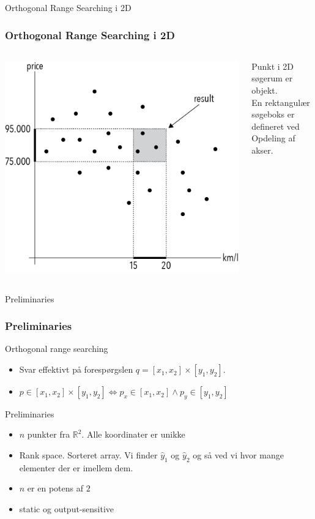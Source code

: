 \documentclass[pdf]{beamer}
\begin{document}
\begin{frame}{Orthogonal Range Searching i 2D}
  \frametitle{Orthogonal Range Searching i 2D}
  \begin{columns}
    \begin{center}
      \includegraphics[scale=0.8]{pictures/introduction.png}
    \end{center}
    Punkt i 2D søgerum er objekt.\\
    
    En rektangulær søgeboks er defineret ved \\

    Opdeling af akser.


  \end{columns}

\end{frame}

\begin{frame}{Preliminaries}
  \frametitle{Preliminaries}
  Orthogonal range searching
  \begin{itemize}
    \item Svar effektivt på forespørgslen $q = [x_1, x_2] \times [y_1, y_2]$.
    \item $p \in [x_1, x_2] \times [y_1, y_2] \Leftrightarrow p_x \in [x_1, x_2] \wedge p_y \in [y_1, y_2]$
  \end{itemize}

  Preliminaries
  \begin{itemize}

    \item $n$ punkter fra $\mathbb{R}^2$. Alle koordinater er unikke
    \item Rank space. Sorteret array. Vi finder $\hat{y}_1$ og $\hat{y}_2$ og så ved vi hvor mange elementer der er imellem dem.
    \item $n$ er en potens af $2$
    \item static og output-sensitive
  \end{itemize}
\end{frame}
\end{document}
